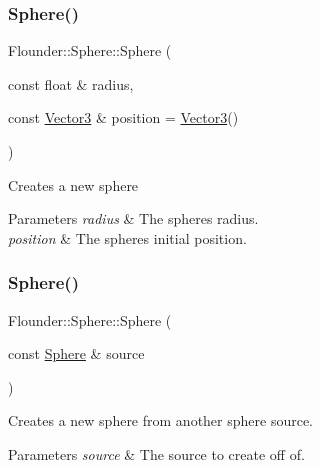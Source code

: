 \subsubsection{\texorpdfstring{Sphere()}{Sphere()}\hspace{0.1cm}{\footnotesize\ttfamily [2/3]}}
{\footnotesize\ttfamily Flounder\+::\+Sphere\+::\+Sphere (\begin{DoxyParamCaption}\item[{const float \&}]{radius,  }\item[{const \hyperlink{class_flounder_1_1_vector3}{Vector3} \&}]{position = {\ttfamily \hyperlink{class_flounder_1_1_vector3}{Vector3}()} }\end{DoxyParamCaption})}



Creates a new sphere 


\begin{DoxyParams}{Parameters}
{\em radius} & The spheres radius. \\
\hline
{\em position} & The spheres initial position. \\
\hline
\end{DoxyParams}
\mbox{\label{class_flounder_1_1_sphere_ab28e482da6fe13fb103aa2d44c76739c}} 
\subsubsection{\texorpdfstring{Sphere()}{Sphere()}\hspace{0.1cm}{\footnotesize\ttfamily [3/3]}}
{\footnotesize\ttfamily Flounder\+::\+Sphere\+::\+Sphere (\begin{DoxyParamCaption}\item[{const \hyperlink{class_flounder_1_1_sphere}{Sphere} \&}]{source }\end{DoxyParamCaption})}



Creates a new sphere from another sphere source. 


\begin{DoxyParams}{Parameters}
{\em source} & The source to create off of. \\
\hline
\end{DoxyParams}
\mbox{\label{class_flounder_1_1_sphere_aae50198206864b0be72b174a2d2a237e}} 
